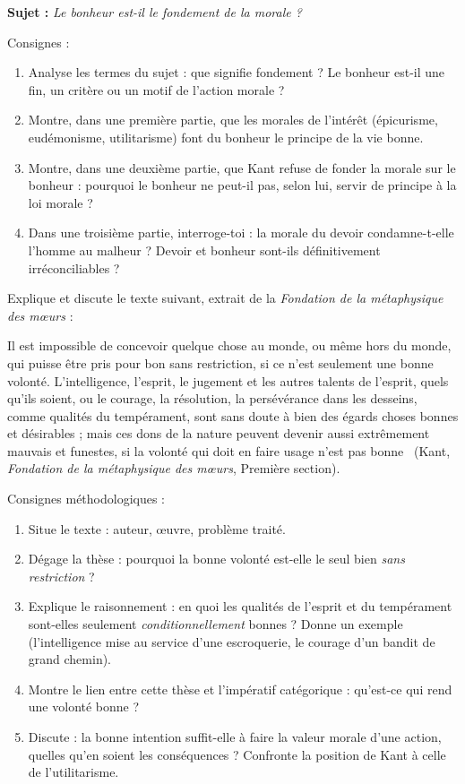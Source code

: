 \documentclass[11pt]{article}
\newcommand{\cle}[1]{{\popxbold\color{popdark}#1}}
\begin{document}
\begin{exercice}
\textbf{Sujet :} \emph{Le bonheur est-il le fondement de la morale ?}

Consignes :
\begin{enumerate}
\item Analyse les termes du sujet : que signifie \guillemotleft fondement \guillemotright ? Le bonheur est-il une fin, un critère ou un motif de l'action morale ?
\item Montre, dans une première partie, que les morales de l'intérêt (épicurisme, eudémonisme, utilitarisme) font du bonheur le principe de la vie bonne.
\item Montre, dans une deuxième partie, que Kant refuse de fonder la morale sur le bonheur : pourquoi le bonheur ne peut-il pas, selon lui, servir de principe à la loi morale ?
\item Dans une troisième partie, interroge-toi : la morale du devoir condamne-t-elle l'homme au malheur ? Devoir et bonheur sont-ils définitivement irréconciliables ?
\end{enumerate}
\end{exercice}

\begin{exercice}
Explique et discute le texte suivant, extrait de la \emph{Fondation de la métaphysique des mœurs} :

\guillemotleft Il est impossible de concevoir quelque chose au monde, ou même hors du monde, qui puisse être pris pour bon sans restriction, si ce n'est seulement une bonne volonté. L'intelligence, l'esprit, le jugement et les autres talents de l'esprit, quels qu'ils soient, ou le courage, la résolution, la persévérance dans les desseins, comme qualités du tempérament, sont sans doute à bien des égards choses bonnes et désirables ; mais ces dons de la nature peuvent devenir aussi extrêmement mauvais et funestes, si la volonté qui doit en faire usage n'est pas bonne \guillemotright\ (Kant, \emph{Fondation de la métaphysique des mœurs}, Première section).

Consignes méthodologiques :
\begin{enumerate}
\item Situe le texte : auteur, œuvre, problème traité.
\item Dégage la thèse : pourquoi la bonne volonté est-elle le seul bien \emph{sans restriction} ?
\item Explique le raisonnement : en quoi les qualités de l'esprit et du tempérament sont-elles seulement \emph{conditionnellement} bonnes ? Donne un exemple (l'intelligence mise au service d'une escroquerie, le courage d'un bandit de grand chemin).
\item Montre le lien entre cette thèse et l'\cle{impératif catégorique} : qu'est-ce qui rend une volonté bonne ?
\item Discute : la bonne intention suffit-elle à faire la valeur morale d'une action, quelles qu'en soient les conséquences ? Confronte la position de Kant à celle de l'utilitarisme.
\end{enumerate}
\end{exercice}
\end{document}
